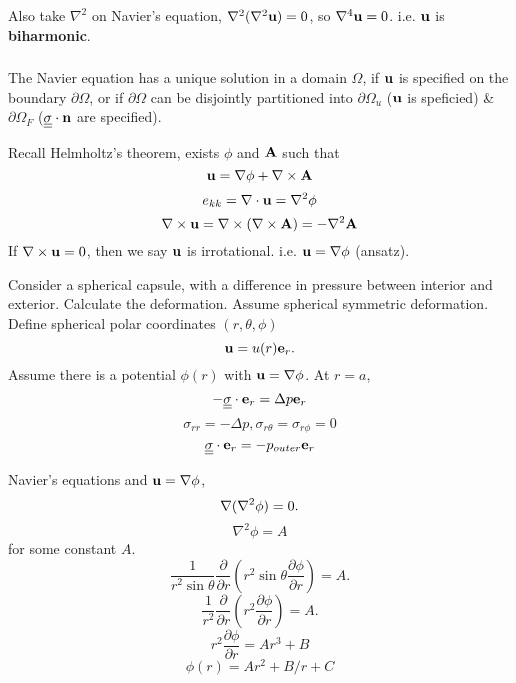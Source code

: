 \documentclass[12pt]{article}
\newcommand{\ee}{{\bf e}}
\newcommand{\nn}{{\bf n}}
\newcommand{\uu}{{\bf u}}
\newcommand{\bA}{{\bf A}}
\newcommand{\bnabla}{{\bf \nabla}}
\newcommand{\ssigma}{{\underline{\underline \sigma}}}
\begin{document}
Also take $\nabla^2$ on Navier's equation, $\nabla^2(\nabla^2\uu)=0$, so $\nabla^4\uu=0$. i.e. $\uu$ is {\bf biharmonic}. 

\subsubsection{}
The Navier equation has a unique solution in a domain $\Omega$, if $\uu$ is specified on the boundary $\partial\Omega$, or if $\partial \Omega$ can be disjointly partitioned into $\partial\Omega_u$ ($\uu$ is speficied) \& $\partial \Omega_F$ ($\ssigma\cdot\nn$ are specified).

Recall Helmholtz's theorem, exists $\phi$ and $\bA$ such that
\[
\uu = \bnabla\phi + \bnabla\times\bA
\]
\[
e_{kk} = \nabla\cdot\uu = \nabla^2\phi
\]
\[
\nabla\times\uu =  \bnabla\times(\bnabla\times\bA) = -\nabla^2\bA
\]
If $\nabla\times\uu=0$, then we say $\uu$ is irrotational. i.e. $\uu = \bnabla\phi$ (ansatz).

Consider a spherical capsule, with a difference in pressure between interior and exterior. Calculate the deformation. Assume spherical symmetric deformation. Define spherical polar coordinates $(r, \theta, \phi)$
\[
\uu = u(r)\ee_r.
\]
Assume there is a potential $\phi(r)$ with $\uu = \nabla\phi$.
At $r = a$, 
\[
-\ssigma\cdot\ee_r = \Delta p \ee_r
\]
\[
\sigma_{rr} = -\Delta p , \sigma_{r\theta} =\sigma_{r\phi}= 0
\]
\[
\ssigma\cdot\ee_r =  -  p_{outer} \ee_r
\]

Navier's equations and $\uu = \nabla\phi$,
\[
\bnabla(\nabla^2\phi)=0.
\]
\[
\nabla^2\phi= A
\]
for some constant $A$.
\[
\frac{1}{r^2\sin\theta}\frac{\partial}{\partial r}(r^2\sin\theta\frac{\partial\phi}{\partial r})= A.
\]
\[
\frac{1}{r^2}\frac{\partial}{\partial r}(r^2\frac{\partial\phi}{\partial r})= A.
\]
\[
r^2\frac{\partial\phi}{\partial r} = Ar^3 + B
\]
\[
\phi(r) = Ar^2 + B/r + C
\]
\end{document}
